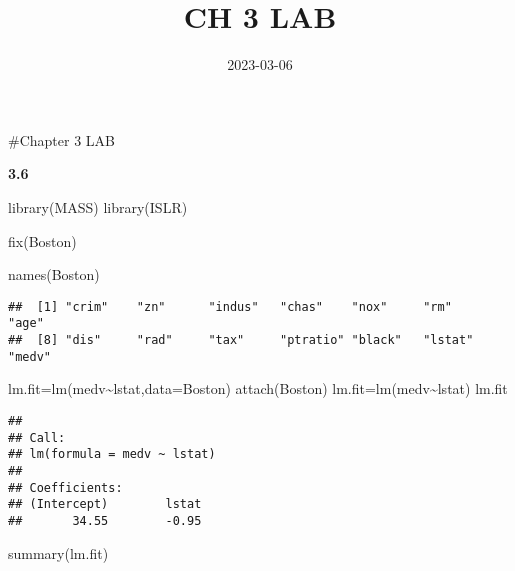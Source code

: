 \documentclass[
]{article}
\title{CH 3 LAB}
\author{}
\date{\vspace{-2.5em}2023-03-06}
\newenvironment{Shaded}{\begin{snugshade}}{\end{snugshade}}
\newcommand{\AttributeTok}[1]{\textcolor[rgb]{0.77,0.63,0.00}{#1}}
\newcommand{\FunctionTok}[1]{\textcolor[rgb]{0.00,0.00,0.00}{#1}}
\newcommand{\NormalTok}[1]{#1}
\newcommand{\OtherTok}[1]{\textcolor[rgb]{0.56,0.35,0.01}{#1}}
\newcommand{\SpecialCharTok}[1]{\textcolor[rgb]{0.00,0.00,0.00}{#1}}
\begin{document}
\maketitle

\#Chapter 3 LAB

\textbf{3.6}

\begin{Shaded}
\begin{Highlighting}[]
\FunctionTok{library}\NormalTok{(MASS)}
\FunctionTok{library}\NormalTok{(ISLR)}
\end{Highlighting}
\end{Shaded}

\begin{Shaded}
\begin{Highlighting}[]
\FunctionTok{fix}\NormalTok{(Boston)}
\end{Highlighting}
\end{Shaded}

\begin{Shaded}
\begin{Highlighting}[]
\FunctionTok{names}\NormalTok{(Boston)}
\end{Highlighting}
\end{Shaded}

\begin{verbatim}
##  [1] "crim"    "zn"      "indus"   "chas"    "nox"     "rm"      "age"    
##  [8] "dis"     "rad"     "tax"     "ptratio" "black"   "lstat"   "medv"
\end{verbatim}

\begin{Shaded}
\begin{Highlighting}[]
\NormalTok{lm.fit}\OtherTok{=}\FunctionTok{lm}\NormalTok{(medv}\SpecialCharTok{\textasciitilde{}}\NormalTok{lstat,}\AttributeTok{data=}\NormalTok{Boston)}
\FunctionTok{attach}\NormalTok{(Boston)}
\NormalTok{lm.fit}\OtherTok{=}\FunctionTok{lm}\NormalTok{(medv}\SpecialCharTok{\textasciitilde{}}\NormalTok{lstat)}
\NormalTok{lm.fit}
\end{Highlighting}
\end{Shaded}

\begin{verbatim}
## 
## Call:
## lm(formula = medv ~ lstat)
## 
## Coefficients:
## (Intercept)        lstat  
##       34.55        -0.95
\end{verbatim}

\begin{Shaded}
\begin{Highlighting}[]
\FunctionTok{summary}\NormalTok{(lm.fit)}
\end{Highlighting}
\end{Shaded}
\end{document}
